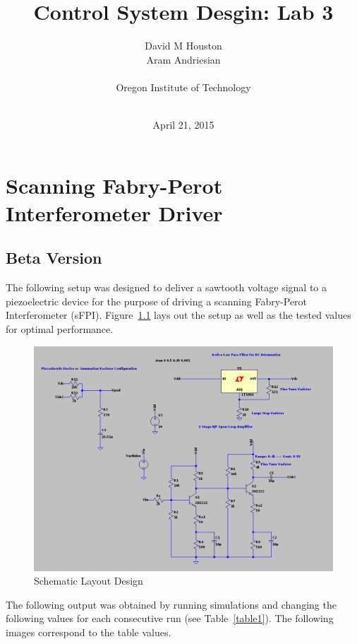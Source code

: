 \documentclass[12pt]{report}
\title{Control System Desgin: Lab 3}
\author{David M Houston\\
	    Aram Andriesian\\\\
		Oregon Institute of Technology\\\\
		}
\date{April 21, 2015}
\begin{document}
\maketitle
\tableofcontents
\listoffigures
\listoftables


\chapter{Scanning Fabry-Perot Interferometer Driver}
\section{ Beta Version}

The following setup was designed to deliver a sawtooth voltage signal to a piezoelectric device for the purpose of driving a scanning Fabry-Perot Interferometer (sFPI). Figure~\ref{fig:schm} lays out the setup as well as the tested values for optimal performance. 

\begin{figure}[h!]
\centering
\includegraphics[width=\textwidth]{schematic_layout.png}
\caption{Schematic Layout Design}
\label{fig:schm}
\end{figure}

The following output was obtained by running simulations and changing the following values for each consecutive run (see Table~\ref{table1}). The following images correspond to the table values.
\end{document}
